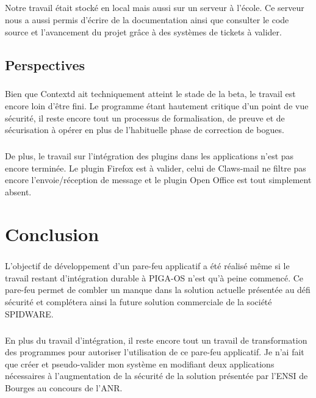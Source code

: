 		\paragraph*{}
			Notre travail était stocké en local mais aussi sur un serveur à l'école. Ce serveur nous a aussi permis d'écrire de la documentation ainsi que consulter le code source et l'avancement du projet grâce à des systèmes de tickets à valider.

	\section{Perspectives}
		\paragraph*{}
			Bien que Contextd ait techniquement atteint le stade de la beta, le travail est encore loin d'être fini. Le programme étant hautement critique d'un point de vue sécurité, il reste encore tout un processus de formalisation, de preuve et de sécurisation à opérer en plus de l'habituelle phase de correction de bogues.
		
		\paragraph*{}
			De plus, le travail sur l'intégration des plugins dans les applications n'est pas encore terminée. Le plugin Firefox est à valider, celui de Claws-mail ne filtre pas encore l'envoie/réception de message et le plugin Open Office est tout simplement absent.
	
\chapter{Conclusion}
	\paragraph*{}
		L'objectif de développement d'un pare-feu applicatif a été réalisé même si le travail restant d'intégration durable à PIGA-OS n'est qu'à peine commencé. Ce pare-feu permet de combler un manque dans la solution actuelle présentée au défi sécurité et complétera ainsi la future solution commerciale de la société SPIDWARE.
		
	\paragraph*{}
		En plus du travail d'intégration, il reste encore tout un travail de transformation des programmes pour autoriser l'utilisation de ce pare-feu applicatif. Je n'ai fait que créer et pseudo-valider mon système en modifiant deux applications nécessaires à l'augmentation de la sécurité de la solution présentée par l'ENSI de Bourges au concours de l'ANR.
		

